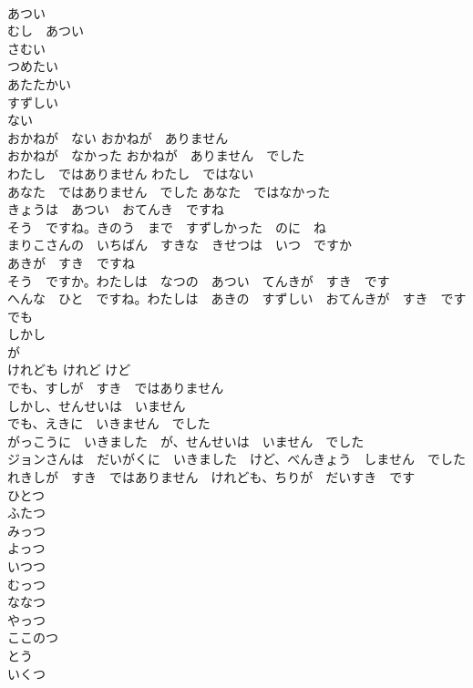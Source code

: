 \documentclass[8pt]{extreport}
\begin{document}
\begin{CJK}{UTF8}{min}
\\	あつい	
\\	むし　あつい	
\\	さむい	
\\	つめたい	
\\	あたたかい	
\\	すずしい	
\\	ない	
\\	おかねが　ない おかねが　ありません	
\\	おかねが　なかった おかねが　ありません　でした	
\\	わたし　ではありません わたし　ではない	
\\	あなた　ではありません　でした あなた　ではなかった	
\\	きょうは　あつい　おてんき　ですね	
\\	そう　ですね。きのう　まで　すずしかった　のに　ね	
\\	まりこさんの　いちばん　すきな　きせつは　いつ　ですか	
\\	あきが　すき　ですね	
\\	そう　ですか。わたしは　なつの　あつい　てんきが　すき　です	
\\	へんな　ひと　ですね。わたしは　あきの　すずしい　おてんきが　すき　です	
\\	でも	
\\	しかし	
\\	が	
\\	けれども けれど けど	
\\	でも、すしが　すき　ではありません	
\\	しかし、せんせいは　いません	
\\	でも、えきに　いきません　でした	
\\	がっこうに　いきました　が、せんせいは　いません　でした	
\\	ジョンさんは　だいがくに　いきました　けど、べんきょう　しません　でした	
\\	れきしが　すき　ではありません　けれども、ちりが　だいすき　です	
\\	ひとつ	
\\	ふたつ	
\\	みっつ	
\\	よっつ	
\\	いつつ	
\\	むっつ	
\\	ななつ	
\\	やっつ	
\\	ここのつ	
\\	とう	
\\	いくつ	

\end{CJK}
\end{document}
